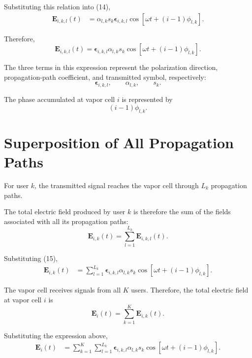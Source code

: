 \documentclass[12pt,a4paper]{article}
\begin{document}
Substituting this relation into (14),
\[
\begin{aligned}
\mathbf E_{i,k,l}(t)
&=
\alpha_{l,k}s_k
\boldsymbol{\epsilon}_{i,k,l}
\cos
\left[
\omega t+(i-1)\phi_{l,k}
\right].
\end{aligned}
\]

Therefore,
\begin{equation}
\boxed{
\mathbf E_{i,k,l}(t)
=
\boldsymbol{\epsilon}_{i,k,l}
\alpha_{l,k}s_k
\cos
\left[
\omega t+(i-1)\phi_{l,k}
\right].
}
\tag{15}
\end{equation}

The three terms in this expression represent the polarization
direction, propagation-path coefficient, and transmitted symbol,
respectively:
\[
\boldsymbol{\epsilon}_{i,k,l},
\qquad
\alpha_{l,k},
\qquad
s_k.
\]

The phase accumulated at vapor cell \(i\) is represented by
\[
(i-1)\phi_{l,k}.
\]



\section{Superposition of All Propagation Paths}

For user \(k\), the transmitted signal reaches the vapor cell
through \(L_k\) propagation paths.

The total electric field produced by user \(k\) is therefore the
sum of the fields associated with all its propagation paths:
\[
\mathbf E_{i,k}(t)
=
\sum_{l=1}^{L_k}
\mathbf E_{i,k,l}(t).
\]

Substituting (15),
\[
\begin{aligned}
\mathbf E_{i,k}(t)
&=
\sum_{l=1}^{L_k}
\boldsymbol{\epsilon}_{i,k,l}
\alpha_{l,k}s_k
\cos
\left[
\omega t+(i-1)\phi_{l,k}
\right].
\end{aligned}
\]

The vapor cell receives signals from all \(K\) users. Therefore,
the total electric field at vapor cell \(i\) is
\[
\mathbf E_i(t)
=
\sum_{k=1}^{K}
\mathbf E_{i,k}(t).
\]

Substituting the expression above,
\[
\begin{aligned}
\mathbf E_i(t)
&=
\sum_{k=1}^{K}
\sum_{l=1}^{L_k}
\boldsymbol{\epsilon}_{i,k,l}
\alpha_{l,k}s_k
\cos
\left[
\omega t+(i-1)\phi_{l,k}
\right].
\end{aligned}
\]
\end{document}

